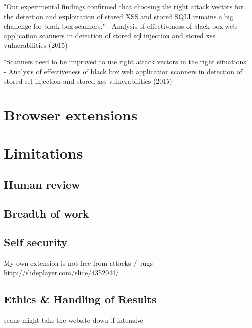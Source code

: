  
 "Our experimental findings confirmed that choosing the right attack vectors for the detection and exploitation of stored XSS and stored SQLI remains a big challenge for black box scanners." - Analysis of effectiveness of black box web application scanners in detection of stored sql injection and stored xss vulnerabilities (2015)
 
 "Scanners need to be improved to use right attack vectors in the right situations" - Analysis of effectiveness of black box web application scanners in detection of stored sql injection and stored xss vulnerabilities (2015)
 
\section{Browser extensions}
 
 
 
 
 

 
\section{Limitations}

\subsection{Human review}

 \subsection{Breadth of  work}
 
 \subsection{Self security}
 	 My own extension is not free from attacks / bugs
http://slideplayer.com/slide/4352044/

\subsection{Ethics \& Handling of Results}

scans might take the website down if intensive
 
